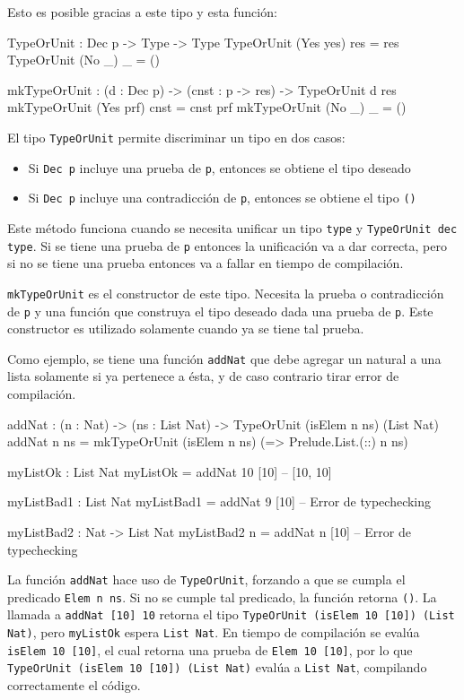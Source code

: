 Esto es posible gracias a este tipo y esta función:

\begin{code}
TypeOrUnit : Dec p -> Type -> Type
TypeOrUnit (Yes yes) res = res
TypeOrUnit (No _) _ = ()

mkTypeOrUnit : (d : Dec p) -> (cnst : p -> res) ->
  TypeOrUnit d res
mkTypeOrUnit (Yes prf) cnst = cnst prf
mkTypeOrUnit (No _) _ = ()
\end{code}

El tipo \texttt{TypeOrUnit} permite discriminar un tipo en dos casos:
\begin{itemize}
\item Si \texttt{Dec p} incluye una prueba de \texttt{p}, entonces se obtiene el tipo deseado
\item Si \texttt{Dec p} incluye una contradicción de \texttt{p}, entonces se obtiene el tipo \texttt{()}
\end{itemize}

Este método funciona cuando se necesita unificar un tipo \texttt{type} y \texttt{TypeOrUnit dec type}. Si se tiene una prueba de \texttt{p} entonces la unificación va a dar correcta, pero si no se tiene una prueba entonces va a fallar en tiempo de compilación.

\texttt{mkTypeOrUnit} es el constructor de este tipo. Necesita la prueba o contradicción de \texttt{p} y una función que construya el tipo deseado dada una prueba de \texttt{p}. Este constructor es utilizado solamente cuando ya se tiene tal prueba.

Como ejemplo, se tiene una función \texttt{addNat} que debe agregar un natural a una lista solamente si ya pertenece a ésta, y de caso contrario tirar error de compilación.

\begin{code}
addNat : (n : Nat) -> (ns : List Nat) ->
  TypeOrUnit (isElem n ns) (List Nat)
addNat n ns = mkTypeOrUnit (isElem n ns)
  (\isElem => Prelude.List.(::) n ns)

myListOk : List Nat
myListOk = addNat 10 [10] -- [10, 10]

myListBad1 : List Nat
myListBad1 = addNat 9 [10] -- Error de typechecking

myListBad2 : Nat -> List Nat
myListBad2 n = addNat n [10] -- Error de typechecking
\end{code}

La función \texttt{addNat} hace uso de \texttt{TypeOrUnit}, forzando a que se cumpla el predicado \texttt{Elem n ns}. Si no se cumple tal predicado, la función retorna \texttt{()}. La llamada a \texttt{addNat [10] 10} retorna el tipo \texttt{TypeOrUnit (isElem 10 [10]) (List Nat)}, pero \texttt{myListOk} espera \texttt{List Nat}. En tiempo de compilación se evalúa \texttt{isElem 10 [10]}, el cual retorna una prueba de \texttt{Elem 10 [10]}, por lo que \texttt{TypeOrUnit (isElem 10 [10]) (List Nat)} evalúa a \texttt{List Nat}, compilando correctamente el código.

